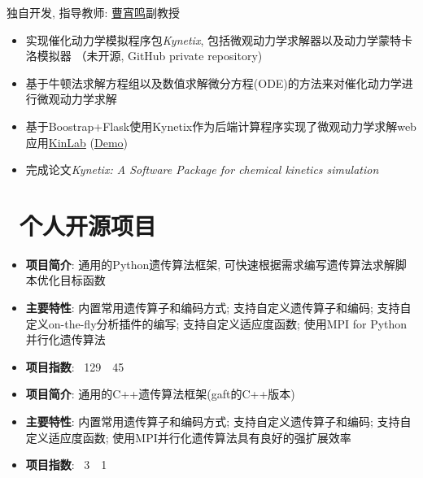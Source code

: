 \documentclass{resume}
\begin{document}
 {独自开发, 指导教师: \faLink \href{http://chem.ecust.edu.cn/2014/1211/c6655a50467/page.htm}{曹宵鸣}副教授}
\begin{onehalfspacing}
\begin{itemize}
    \item 实现催化动力学模拟程序包\emph{Kynetix}, 包括微观动力学求解器以及动力学蒙特卡洛模拟器 （未开源, GitHub private repository)
    \item 基于牛顿法求解方程组以及数值求解微分方程(ODE)的方法来对催化动力学进行微观动力学求解
    \item 基于Boostrap+Flask使用Kynetix作为后端计算程序实现了微观动力学求解web应用\faLink \href{https://github.com/PytLab/KinLab}{KinLab} (\faLink \href{http://123.206.225.154:5000/}{Demo})
    \item 完成论文\emph{Kynetix: A Software Package for chemical kinetics simulation}
\end{itemize}
\end{onehalfspacing}

\section{\faUser\ 个人开源项目}

\begin{onehalfspacing}
\begin{itemize}
    \item \textbf{项目简介}: 通用的Python遗传算法框架, 可快速根据需求编写遗传算法求解脚本优化目标函数
    \item \textbf{主要特性}: 内置常用遗传算子和编码方式; 支持自定义遗传算子和编码; 支持自定义on-the-fly分析插件的编写; 支持自定义适应度函数; 使用MPI for Python并行化遗传算法
    \item \textbf{项目指数}: \faStar\ 129\, \faCodeFork\ 45
\end{itemize}
\end{onehalfspacing}

\begin{onehalfspacing}
\begin{itemize}
    \item \textbf{项目简介}: 通用的C++遗传算法框架(gaft的C++版本)
    \item \textbf{主要特性}: 内置常用遗传算子和编码方式; 支持自定义遗传算子和编码; 支持自定义适应度函数; 使用MPI并行化遗传算法具有良好的强扩展效率
    \item \textbf{项目指数}: \faStar\ 3\, \faCodeFork\ 1
\end{itemize}
\end{onehalfspacing}
\end{document}
